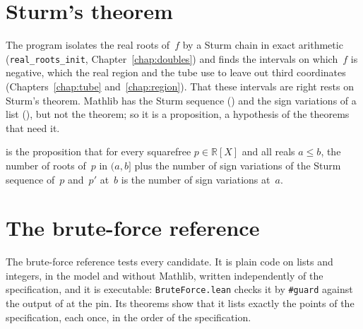 \section{Sturm's theorem}\label{sec:specSturm}

The program isolates the real roots of~$f$ by a Sturm chain in exact arithmetic
(\texttt{real\_roots\_init}, Chapter~\ref{chap:doubles}) and finds the intervals on which~$f$ is
negative, which the real region and the tube use to leave out third coordinates
(Chapters~\ref{chap:tube} and~\ref{chap:region}). That these intervals are right rests on Sturm's
theorem. Mathlib has the Sturm sequence () and the sign variations of a
list (), but not the theorem; so it is a proposition, a hypothesis of
the theorems that need it.

\begin{definition}\label{def:SturmTheorem}
  \leanok
   is the proposition that for every squarefree $p \in \mathbb{R}[X]$
  and all reals $a \le b$, the number of roots of~$p$ in $(a, b]$ plus the number of sign
  variations of the Sturm sequence of~$p$ and~$p'$ at~$b$ is the number of sign variations at~$a$.
\end{definition}


\section{The brute-force reference}\label{sec:specBruteForce}

The brute-force reference tests every candidate. It is plain code on lists and integers, in the
model and without Mathlib, written independently of the specification, and it is executable:
\verb|BruteForce.lean| checks it by \verb|#guard| against the output of \jpoints{} at the pin. Its
theorems show that it lists exactly the points of the specification, each once, in the order of
the specification.

